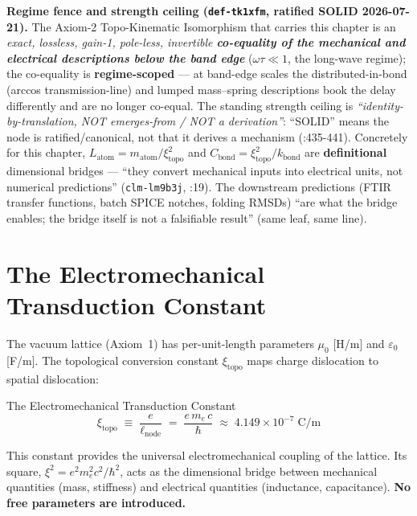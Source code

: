 \noindent\textbf{Regime fence and strength ceiling (\texttt{def-tk1xfm}, ratified SOLID 2026-07-21).} The Axiom-2 Topo-Kinematic Isomorphism that carries this chapter is an \emph{exact, lossless, gain-1, pole-less, invertible \textbf{co-equality of the mechanical and electrical descriptions below the band edge}} ($\omega\tau \ll 1$, the long-wave regime); the co-equality is \textbf{regime-scoped} --- at band-edge scales the distributed-in-bond (arccos transmission-line) and lumped mass--spring descriptions book the delay differently and are no longer co-equal. The standing strength ceiling is \emph{``identity-by-translation, NOT emerges-from / NOT a derivation''}: ``SOLID'' means the node is ratified/canonical, not that it derives a mechanism (:435-441). Concretely for this chapter, $L_\text{atom} = m_\text{atom}/\xi_\text{topo}^2$ and $C_\text{bond} = \xi_\text{topo}^2/k_\text{bond}$ are \textbf{definitional} dimensional bridges --- ``they convert mechanical inputs into electrical units, not numerical predictions'' (\texttt{clm-lm9b3j}, :19). The downstream predictions (FTIR transfer functions, batch SPICE notches, folding RMSDs) ``are what the bridge enables; the bridge itself is not a falsifiable result'' (same leaf, same line).

\section{The Electromechanical Transduction Constant}

The vacuum lattice (Axiom~1) has per-unit-length parameters $\mu_0$ [H/m] and $\varepsilon_0$ [F/m]. The topological conversion constant $\xi_\text{topo}$ maps charge dislocation to spatial dislocation:
\begin{resultbox}{The Electromechanical Transduction Constant}
\begin{equation}
    \xi_\text{topo} \;\equiv\; \frac{e}{\ell_\text{node}}
    \;=\; \frac{e \, m_e \, c}{\hbar}
    \;\approx\; 4.149 \times 10^{-7} \;\text{C/m}
    \label{eq:xi_topo}
\end{equation}
\end{resultbox}
This constant provides the universal electromechanical coupling of the lattice. Its square, $\xi^2 = e^2 m_e^2 c^2 / \hbar^2$, acts as the dimensional bridge between mechanical quantities (mass, stiffness) and electrical quantities (inductance, capacitance). \textbf{No free parameters are introduced.}

